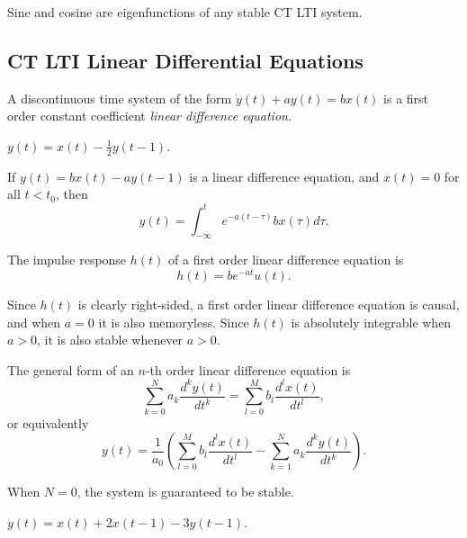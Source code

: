 \begin{cor}
    Sine and cosine are eigenfunctions of any stable CT LTI system.
\end{cor}

\subsection{CT LTI Linear Differential Equations}

\begin{defn}
    A discontinuous time system of the form $\dot{y}(t) + ay(t) = bx(t)$ is a first order constant coefficient \emph{linear difference equation}.
\end{defn}

\begin{exmp}
    $y(t) = x(t) - \frac{1}{2}y(t-1)$.
\end{exmp}

\begin{prop}
    If $y(t) = bx(t) - ay(t-1)$ is a linear difference equation, and $x(t) = 0$ for all $t < t_0$, then
    \[y(t) = \int_{-\infty}^{t}e^{-a(t-\tau)}bx(\tau)d\tau.\]
\end{prop}

\begin{prop}
    The impulse response $h(t)$ of a first order linear difference equation is
    \[h(t) = be^{-at}u(t).\]
\end{prop}

\begin{rmk}
    Since $h(t)$ is clearly right-sided, a first order linear difference equation is causal, and when $a = 0$ it is also memoryless. Since $h(t)$ is absolutely integrable when $a > 0$, it is also stable whenever $a > 0$.
\end{rmk}

\begin{defn}
    The general form of an $n$-th order linear difference equation is
    \[\sum_{k=0}^{N}a_k\frac{d^ky(t)}{dt^k} = \sum_{l=0}^{M}b_l\frac{d^lx(t)}{dt^l},\] or equivalently
    \[y(t) = \frac{1}{a_0}\left(\sum_{l=0}^{M}b_l\frac{d^lx(t)}{dt^l}-\sum_{k=1}^{N}a_k\frac{d^ky(t)}{dt^k}\right).\]
\end{defn}

\begin{rmk}
    When $N = 0$, the system is guaranteed to be stable.
\end{rmk}

\begin{exmp}
    $y(t) = x(t) + 2x(t-1) - 3y(t-1)$.
\end{exmp}

